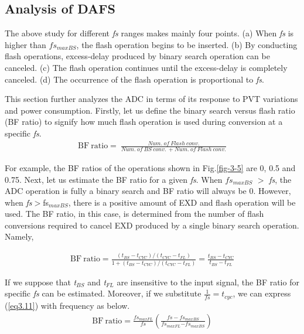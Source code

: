 \subsection{Analysis of DAFS}
The above study for different \textit{fs} ranges makes mainly four points. (a) When \textit{fs} is higher than $fs{}_{maxBS}$, the flash operation begins to be inserted. (b) By conducting flash operations, excess-delay produced by binary search operation can be canceled. (c) The flash operation continues until the excess-delay is completely canceled. (d) The occurrence of the flash operation is proportional to \textit{fs}. 

This section further analyzes the ADC in terms of its response to PVT variations and power consumption. Firstly, let us define the binary search versus flash ratio (BF ratio) to signify how much flash operation is used during conversion at a specific \textit{fs}.
\begin{eqnarray}
  \mathrm{BF\ ratio=\ }\frac{Num.\ of\ Flash\ conv.}{Num.\ of\ BS\ conv.\ +Num.\ of\ Flash\ conv.} 
\end{eqnarray}

For example, the BF ratios of the operations shown in Fig.\ref{fig-3-5} are 0, 0.5 and 0.75. Next, let us estimate the BF ratio for a given \textit{fs}. When $fs{}_{maxBS}$ $\mathrm{>}$ \textit{fs}, the ADC operation is fully a binary search and BF ratio will always be 0. However, when \textit{fs}$\mathrm{>}$fs${}_{maxBS}$, there is a positive amount of EXD and flash operation will be used. The BF ratio, in this case, is determined from the number of flash conversions required to cancel EXD produced by a single binary search operation. Namely,

\begin{eqnarray}
  \mathrm{BF\ ratio=}\frac{(t_{BS}-t_{CYC})/(t_{CYC}-t_{FL})}{1+(t_{BS}-t_{CYC})/(t_{CYC}-t_{FL})}\mathrm{=}\frac{t_{BS}-t_{CYC}}{t_{BS}-t_{FL}}
  \label{eq3.11}
\end{eqnarray}

If we suppose that \textit{t${}_{BS}$} and \textit{t${}_{FL}$} are insensitive to the input signal, the BF ratio for specific \textit{fs} can be estimated. Moreover, if we substitute $\frac{1}{fs}=t_{cyc}$, we can express (\ref{eq3.11}) with frequency as below.
\begin{eqnarray}
  \mathrm{BF\ ratio=}\frac{{fs}_{maxFL}}{fs}\left(\frac{fs-{fs}_{maxBS}}{{fs}_{maxFL}\mathrm{-}{fs}_{maxBS}}\right)
  \label{eq3.12}
\end{eqnarray}

